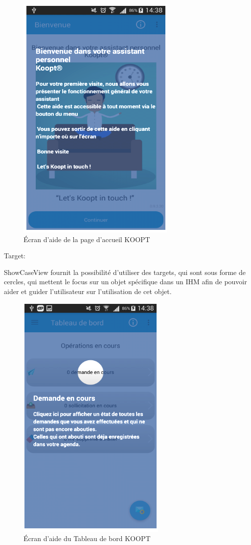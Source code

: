  \begin{figure}[H]
\begin{center}
\includegraphics[width=0.5\linewidth]{images/help}
\end{center}
\caption{Écran d'aide de la page d'accueil KOOPT}
\label{fig:12}
\end{figure}
Target: 
 
ShowCaseView fournit la possibilité d’utiliser des targets,  qui sont sous forme de cercles, qui 
mettent  le focus sur un objet spécifique dans un IHM afin de pouvoir aider et guider l’utilisateur sur l’utilisation de cet objet. 

 \begin{figure}[H]
\begin{center}
\includegraphics[width=0.5\linewidth]{images/helptarget}
\end{center}
\caption{Écran d'aide du Tableau de bord KOOPT}
\label{fig:13}
\end{figure}

